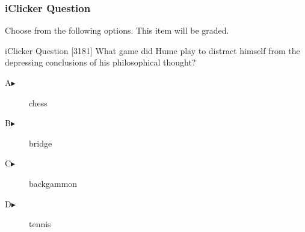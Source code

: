 \begin{frame}
  \frametitle{iClicker Question}
Choose from the following options. This item will be graded.
\begin{block}{iClicker Question}
[3181] What game did Hume play to distract himself from the depressing
conclusions of his philosophical thought?
\end{block}
\begin{description}
\item[A\hspace{.2in}$\blacktriangleright$] chess
\item[B\hspace{.2in}$\blacktriangleright$] bridge
\item[C\hspace{.2in}$\blacktriangleright$] backgammon
\item[D\hspace{.2in}$\blacktriangleright$] tennis
\end{description}
\end{frame}
